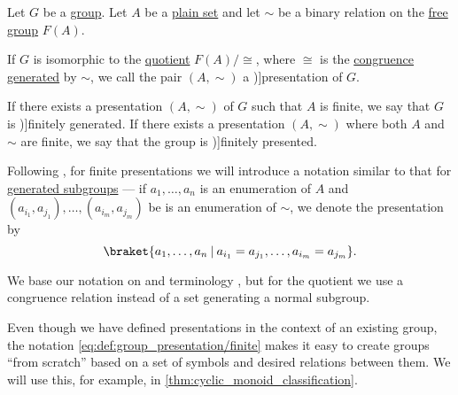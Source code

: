 \begin{definition}\label{def:group_presentation}\mimprovised
  Let \( G \) be a \hyperref[def:group]{group}. Let \( A \) be a \hyperref[def:set]{plain set} and let \( {\sim} \) be a binary relation on the \hyperref[def:free_group]{free group} \( F(A) \).

  If \( G \) is isomorphic to the \hyperref[def:group/quotient]{quotient} \( F(A) / {\cong} \), where \( {\cong} \) is the \hyperref[def:first_order_congruence]{congruence} \hyperref[def:first_order_generated_congruence]{generated} by \( {\sim} \), we call the pair \( (A, {\sim}) \) a \term[en=(group) presentation (\cite[90]{Bourbaki1998Algebra1to3})]{presentation} of \( G \).

  If there exists a presentation \( (A, {\sim}) \) of \( G \) such that \( A \) is finite, we say that \( G \) is \term[en=finitely generated (\cite[90]{Bourbaki1998Algebra1to3})]{finitely generated}. If there exists a presentation \( (A, \sim) \) where both \( A \) and \( {\sim} \) are finite, we say that the group is \term[en=finitely presented (\cite[90]{Bourbaki1998Algebra1to3})]{finitely presented}.

  Following , for finite presentations we will introduce a notation similar to that for \hyperref[def:group/generated]{generated subgroups} --- if \( a_1, \ldots, a_n \) is an enumeration of \( A \) and \( (a_{i_1}, a_{j_1}), \ldots, (a_{i_m}, a_{j_m}) \) be is an enumeration of \( {\sim} \), we denote the presentation by
  \begin{equation}\label{eq:def:group_presentation/finite}
    \braket{ a_1, \ldots, a_n \given a_{i_1} = a_{j_1}, \ldots, a_{i_m} = a_{j_m} }.
  \end{equation}
\end{definition}
\begin{comments}
  \item We base our notation on and terminology \cite[90]{Bourbaki1998Algebra1to3}, but for the quotient we use a congruence relation instead of a set generating a normal subgroup.

  \item Even though we have defined presentations in the context of an existing group, the notation \eqref{eq:def:group_presentation/finite} makes it easy to create groups \enquote{from scratch} based on a set of symbols and desired relations between them. We will use this, for example, in \cref{thm:cyclic_monoid_classification}.
\end{comments}

